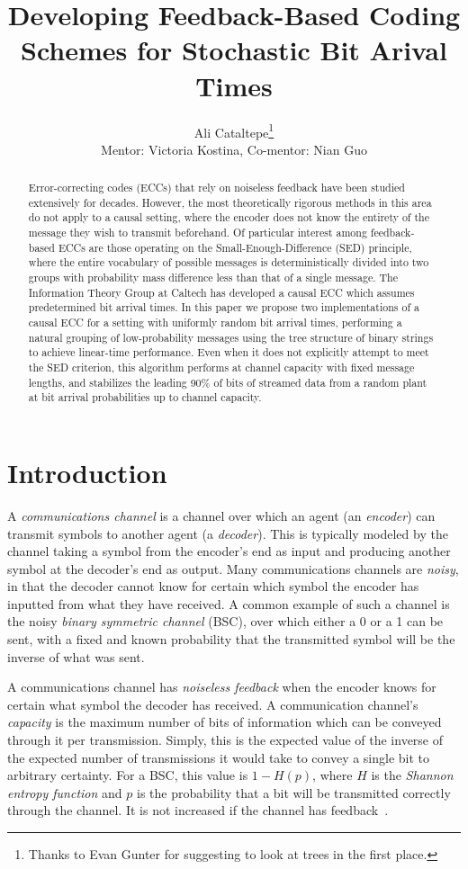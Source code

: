 \documentclass{IEEEtran}
\title{Developing Feedback-Based Coding Schemes for Stochastic Bit Arival
Times}
\author{Ali Cataltepe\thanks{Thanks to Evan Gunter for suggesting to look at
trees in the first place.}\\ Mentor: Victoria Kostina, Co-mentor: Nian Guo}
\date{}
\begin{document}
\maketitle
\begin{abstract}
Error-correcting codes (ECCs) that rely on noiseless feedback have been
studied extensively for decades. However, the most theoretically rigorous
methods in this area do not apply to a causal setting, where the encoder
does not know the entirety of the message they wish to transmit beforehand.
Of particular interest among feedback-based ECCs are those operating on the
Small-Enough-Difference (SED) principle, where the entire vocabulary of
possible messages is deterministically divided into two groups with probability
mass difference less than that of a single message.
The Information Theory Group at
Caltech has developed a causal ECC which assumes predetermined bit arrival
times. In this paper we propose two implementations of a causal ECC for
a setting with uniformly random bit arrival times, performing a natural
grouping of low-probability messages using the tree structure of binary
strings to achieve linear-time performance. Even when it does not
explicitly	
attempt to
meet the SED criterion, this algorithm performs at channel capacity
with fixed message lengths, and stabilizes the leading 90\% of bits of
streamed data from a random plant at bit arrival probabilities up to channel
capacity.
\end{abstract}
\section{Introduction}
A \textit{communications channel} is a channel over which an
agent (an \textit{encoder}) can transmit symbols to another agent
(a \textit{decoder}).
This is typically modeled by the channel taking a symbol from the encoder's
end as input and producing another symbol at the decoder's end as output.
Many communications channels are \textit{noisy}, in that the decoder cannot
know for certain which symbol the encoder has inputted from what they have
received. A common example of such a channel is the
noisy \textit{binary symmetric channel} (BSC), over which either a 0
or a 1 can be sent, with a fixed and known probability that
the transmitted symbol will be the inverse of what was sent.

A communications
channel has \textit{noiseless feedback} when the encoder knows for certain
what symbol the decoder has received. A communication channel's
\textit{capacity} is the maximum number of bits of information
which can be conveyed through it per transmission. Simply, this is the
expected value of the inverse of the expected number of transmissions it
would take to
convey a single bit to arbitrary certainty. For a BSC, this value is
$1-H(p)$, where $H$ is the
\textit{Shannon entropy function} and $p$ is the probability
that a bit will be transmitted correctly through the channel. It is
not increased if the channel has feedback~\cite{horsteinseq}.
\end{document}
